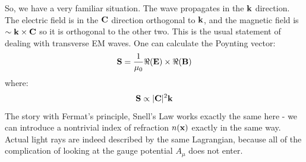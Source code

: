 So, we have a very familiar situation. The wave propagates in the $\mathbf{k}$ direction. The electric field is in the $\mathbf{C}$ direction orthogonal to $\mathbf{k}$, and the magnetic field is $\sim \mathbf{k} \times \mathbf{C}$ so it is orthogonal to the other two. This is the usual statement of dealing with transverse EM waves. One can calculate the Poynting vector:
\begin{equation}
    \mathbf{S} = \frac{1}{\mu_0}\Re(\mathbf{E}) \times \Re(\mathbf{B})
\end{equation}
where:
\begin{equation}
    \mathbf{S} \propto \lvert \mathbf{C} \rvert^2\mathbf{k}
\end{equation}
The story with Fermat's principle, Snell's Law works exactly the same here - we can introduce a nontrivial index of refraction $n(\mathbf{x})$ exactly in the same way. Actual light rays are indeed described by the same Lagrangian, because all of the complication of looking at the gauge potential $A_\mu$ does not enter.